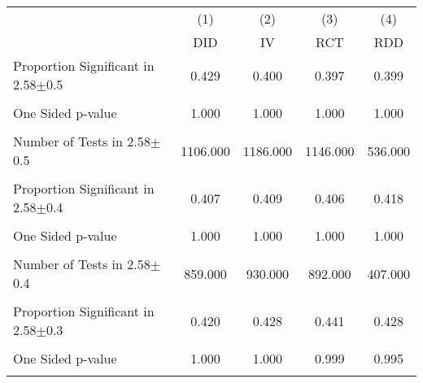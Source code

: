 {
\def\sym#1{\ifmmode^{#1}\else\(^{#1}\)\fi}
\begin{tabular}{l*{4}{c}}
\hline\hline
                &\multicolumn{1}{c}{(1)}&\multicolumn{1}{c}{(2)}&\multicolumn{1}{c}{(3)}&\multicolumn{1}{c}{(4)}\\
                &\multicolumn{1}{c}{DID}&\multicolumn{1}{c}{IV}&\multicolumn{1}{c}{RCT}&\multicolumn{1}{c}{RDD}\\
\hline
\hline Proportion Significant in 2.58$\pm$0.5&    0.429         &    0.400         &    0.397         &    0.399         \\
                &                  &                  &                  &                  \\
One Sided p-value&    1.000         &    1.000         &    1.000         &    1.000         \\
                &                  &                  &                  &                  \\
Number of Tests in 2.58$\pm$0.5& 1106.000         & 1186.000         & 1146.000         &  536.000         \\
                &                  &                  &                  &                  \\
\hline Proportion Significant in 2.58$\pm$0.4&    0.407         &    0.409         &    0.406         &    0.418         \\
                &                  &                  &                  &                  \\
One Sided p-value&    1.000         &    1.000         &    1.000         &    1.000         \\
                &                  &                  &                  &                  \\
Number of Tests in 2.58$\pm$0.4&  859.000         &  930.000         &  892.000         &  407.000         \\
                &                  &                  &                  &                  \\
\hline Proportion Significant in 2.58$\pm$0.3&    0.420         &    0.428         &    0.441         &    0.428         \\
                &                  &                  &                  &                  \\
One Sided p-value&    1.000         &    1.000         &    0.999         &    0.995         \\
                &                  &                  &                  &                  \\

\end{tabular}}
